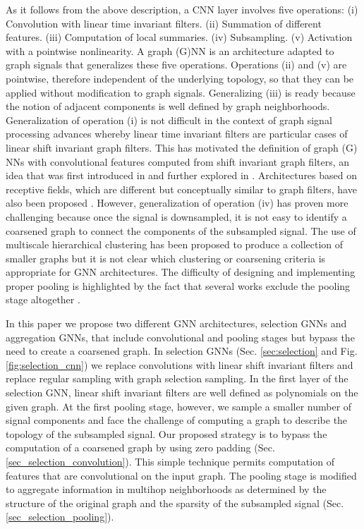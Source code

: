 As it follows from the above description, a CNN layer involves five operations: (i) Convolution with linear time invariant filters. (ii) Summation of different features. (iii) Computation of local summaries. (iv) Subsampling. (v) Activation with a pointwise nonlinearity. A graph (G)NN is an architecture adapted to graph signals that generalizes these five operations. Operations (ii) and (v) are pointwise, therefore independent of the underlying topology, so that they can be applied without modification to graph signals. Generalizing (iii) is ready because the notion of adjacent components is well defined by graph neighborhoods. Generalization of operation (i) is not difficult in the context of graph signal processing advances whereby linear time invariant filters are particular cases of linear shift invariant graph filters. This has motivated the definition of graph (G) NNs with convolutional features computed from shift invariant graph filters, an idea that was first introduced in \cite{bruna14-deepspectralnetworks} and further explored in \cite{henaff15-deepgraph, atwood16-diffusion, defferrard17-cnngraphs, du17-topoadapt, kipf17-classifgcnn, gama18-mimo}. Architectures based on receptive fields, which are different but conceptually similar to graph filters, have also been proposed \cite{niepert16-learningcnn, pasdeloup17-approxtrans, velickovic18-graphattentionnetworks}. However, generalization of operation (iv) has proven more challenging because once the signal is downsampled, it is not easy to identify a coarsened graph to connect the components of the subsampled signal. The use of multiscale hierarchical clustering has been proposed to produce a collection of smaller graphs \cite{bruna14-deepspectralnetworks, henaff15-deepgraph, defferrard17-cnngraphs} but it is not clear which clustering or coarsening criteria is appropriate for GNN architectures. The difficulty of designing and implementing proper pooling is highlighted by the fact that several works exclude the  pooling stage altogether \cite{du17-topoadapt, niepert16-learningcnn, pasdeloup17-approxtrans, gama18-nvgf}. 

In this paper we propose two different GNN architectures, selection GNNs and aggregation GNNs, that include convolutional and pooling stages but bypass the need to create a coarsened graph. In selection GNNs (Sec. \ref{sec:selection} and Fig. \ref{fig:selection_cnn}) we replace convolutions with linear shift invariant filters and replace regular sampling with graph selection sampling. In the first layer of the selection GNN, linear shift invariant filters are well defined as polynomials on the given graph. At the first pooling stage, however, we sample a smaller number of signal components and face the challenge of computing a graph to describe the topology of the subsampled signal. Our proposed strategy is to bypass the computation of a coarsened graph by using zero padding (Sec. \ref{sec_selection_convolution}). This simple technique permits computation of features that are convolutional on the input graph. The pooling stage is modified to aggregate information in multihop neighborhoods as determined by the structure of the original graph and the sparsity of the subsampled signal (Sec. \ref{sec_selection_pooling}).

